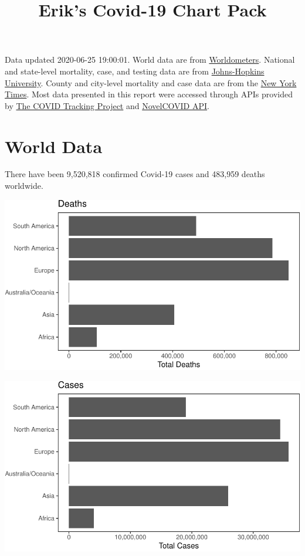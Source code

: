 \documentclass[]{article}
\title{Erik's Covid-19 Chart Pack}
\author{}
\date{}
\begin{document}
\maketitle

Data updated 2020-06-25 19:00:01. World data are from
\href{https://github.com/NovelCovid/API}{Worldometers}. National and
state-level mortality, case, and testing data are from
\href{https://covidtracking.com}{Johns-Hopkins University}. County and
city-level mortality and case data are from the
\href{https://github.com/NovelCovid/API}{New York Times}. Most data
presented in this report were accessed through APIs provided by
\href{https://covidtracking.com}{The COVID Tracking Project} and
\href{https://github.com/NovelCovid/API}{NovelCOVID API}.

\hypertarget{world-data}{%
\section{World Data}\label{world-data}}

There have been 9,520,818 confirmed Covid-19 cases and 483,959 deaths
worldwide.

\includegraphics{covid_files/figure-latex/unnamed-chunk-1-1.pdf}

\includegraphics{covid_files/figure-latex/unnamed-chunk-2-1.pdf}
\end{document}
